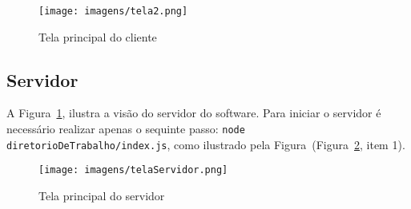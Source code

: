 \documentclass[10pt]{article}
\begin{document}
	\begin{figure}[htbp]
	\centerline{\texttt{[image: imagens/tela2.png]}}
    \caption{Tela principal do cliente}
    \label{fig:telaCliente}
   	\end{figure}
	
	\subsection{Servidor} \label{utilizacao:servidor}
	A Figura~\ref{fig:telaCliente}, ilustra a visão do servidor do software. Para iniciar o servidor é necessário realizar apenas o sequinte passo: \verb+node diretorioDeTrabalho/index.js+, como ilustrado pela Figura~(Figura~\ref{fig:telaServidor}, item 1).
	
	\begin{figure}[htbp]
	\centerline{\texttt{[image: imagens/telaServidor.png]}}
    \caption{Tela principal do servidor}
    \label{fig:telaServidor}
   	\end{figure}
\end{document}
